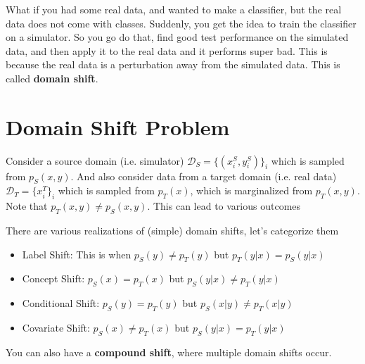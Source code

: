 What if you had some real data, and wanted to make a classifier, but the real data does not come with classes. Suddenly, you get the idea to train the classifier on a simulator. So you go do that, find good test performance on the simulated data, and then apply it to the real data and it performs super bad. This is because the real data is a perturbation away from the simulated data. This is called \textbf{domain shift}.

\section{Domain Shift Problem}
Consider a source domain (i.e. simulator) $\mathcal D_S = \{(x_i^S , y_i^S)\}_{i}$ which is sampled from $p_S(x,y)$. And also consider data from a target domain (i.e. real data) $\mathcal D_T = \{x_i^T\}_i$ which is sampled from $p_T(x)$, which is marginalized from $p_T(x,y)$. Note that $p_T(x,y) \neq p_S(x,y)$. This can lead to various outcomes
\begin{definition}
	 There are various realizations of (simple) domain shifts, let's categorize them
	\begin{itemize}
		\item Label Shift: This is when $p_S(y) \neq p_T(y)$ but $p_T(y|x) = p_S(y|x)$
		\item Concept Shift: $p_S(x) = p_T(x)$ but $p_S(y|x) \neq p_T(y | x)$
		\item Conditional Shift: $p_S(y) = p_T(y)$ but $p_S(x|y) \neq p_T(x|y)$
		\item Covariate Shift: $p_S(x) \neq p_T(x)$ but $p_S(y|x) = p_T(y|x)$
	\end{itemize}
\end{definition}
You can also have a \textbf{compound shift}, where multiple domain shifts occur.

